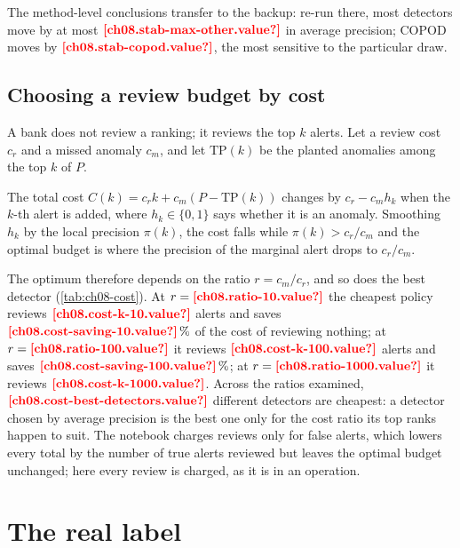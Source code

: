 The method-level conclusions transfer to the backup: re-run there, most detectors move by at most
$\est{ch08.stab-max-other}{value}$ in average precision; COPOD moves by $\est{ch08.stab-copod}{value}$, the most
sensitive to the particular draw.

\subsection{Choosing a review budget by cost}

A bank does not review a ranking; it reviews the top $k$ alerts. Let a review cost $c_r$ and a missed anomaly
$c_m$, and let $\mathrm{TP}(k)$ be the planted anomalies among the top $k$ of $P$.

\begin{proposition}\label{prop:ad-cost}
The total cost $C(k) = c_r k + c_m (P - \mathrm{TP}(k))$ changes by $c_r - c_m h_k$ when the $k$-th alert is
added, where $h_k \in \{0, 1\}$ says whether it is an anomaly. Smoothing $h_k$ by the local precision $\pi(k)$, the cost
falls while $\pi(k) > c_r / c_m$ and the optimal budget is where the precision of the marginal alert drops to
$c_r / c_m$.
\end{proposition}

The optimum therefore depends on the ratio $r = c_m / c_r$, and so does the best detector (\cref{tab:ch08-cost}). At
$r = \est{ch08.ratio-10}{value}$ the cheapest policy reviews $\est{ch08.cost-k-10}{value}$ alerts and saves
$\est{ch08.cost-saving-10}{value}\,\%$ of the cost of reviewing nothing; at $r = \est{ch08.ratio-100}{value}$ it
reviews $\est{ch08.cost-k-100}{value}$ alerts and saves $\est{ch08.cost-saving-100}{value}\,\%$; at
$r = \est{ch08.ratio-1000}{value}$ it reviews $\est{ch08.cost-k-1000}{value}$. Across the ratios examined,
$\est{ch08.cost-best-detectors}{value}$ different detectors are cheapest: a detector chosen by average precision is the
best one only for the cost ratio its top ranks happen to suit. The notebook charges reviews only for false alerts,
which lowers every total by the number of true alerts reviewed but leaves the optimal budget unchanged; here every
review is charged, as it is in an operation.



\section{The real label}\label{sec:ad-fraud}

